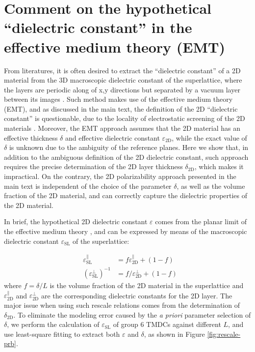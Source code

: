 \documentclass[manuscript=suppinfo,email=true,hyperref=true,keywords=false]{achemso}
\begin{document}
\pagebreak{}
\section{Comment on the hypothetical ``dielectric constant'' in the effective medium theory (EMT)}
\label{sec:2D-3D-rescale}
From literatures, it is often desired to extract the ``dielectric
constant'' of a 2D material from the 3D macroscopic dielectric
constant of the superlattice, where the layers are periodic along of
x,y directions but separated by a vacuum layer between its images
\cite{Matthes_2016,Laturia_2018}. Such method makes use of the
effective medium theory (EMT), and as discussed in the main text, the
definition of the 2D ``dielectric constant'' is questionable, due to
the locality of electrostatic screening of the 2D materials
\cite{Cudazzo_2010_screen2D,Cudazzo_2011_screening_2D}. Moreover, the
EMT approach assumes that the 2D material has an effective thickness
$\delta$ and effective dielectric constant
$\varepsilon_{\mathrm{2D}}$, while the exact value of $\delta$ is
unknown due to the ambiguity of the reference planes. Here we show
that, in addition to the ambiguous definition of the 2D dielectric
constant, such approach requires the precise determination of the 2D
layer thickness $\delta_{\mathrm{2D}}$, which makes it impractical. On
the contrary, the 2D polarizability approach presented in the main
text is independent of the choice of the parameter $\delta$, as well
as the volume fraction of the 2D material, and can correctly capture
the dielectric properties of the 2D material. 

In brief, the hypothetical 2D dielectric constant
$\varepsilon$ comes from the planar limit of the
effective medium theory \cite{Markel_2016,Aspnes_1982}, and can be
expressed by means of the macroscopic dielectric constant
$\varepsilon_{\mathrm{SL}}$ of the superlattice:

\begin{eqnarray}
  \label{eq:MG-effect-1}
  &\varepsilon_{\mathrm{SL}}^{\parallel} &= f \varepsilon_{\mathrm{2D}}^{\parallel} + (1 - f)\\
  \label{eq:MG-effect-2}
  &(\varepsilon_{\mathrm{SL}}^{\perp})^{-1} &= f /\varepsilon_{\mathrm{2D}}^{\perp} + (1-f)
\end{eqnarray}
where $f=\delta/L$ is the volume fraction of the 2D
material in the superlattice and $\varepsilon_{\mathrm{2D}}^{\parallel}$ and 
$\varepsilon_{\mathrm{2D}}^{\perp}$ are the corresponding dielectric constants for the 2D layer. 
The major issue when using such rescale
relations comes from the determination of $\delta_{\mathrm{2D}}$. To
eliminate the modeling error caused by the \textit{a priori} parameter
selection of $\delta$, we perform the calculation of
$\varepsilon_{\mathrm{SL}}$ of group 6 TMDCs against different $L$,
and use least-square fitting to extract both
$\varepsilon$ and $\delta$, as shown in
Figure \ref{fig:rescale-prb}.
\end{document}
